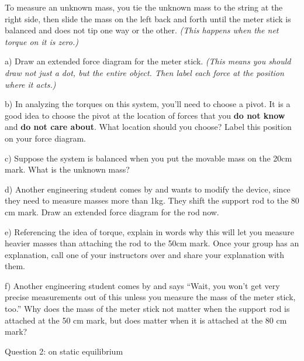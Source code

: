 \documentclass[12pt]{article}
\begin{document}
To measure an unknown mass, you tie the unknown mass to the string at the right side, then slide the mass on the left back and forth until the meter stick is balanced and does not tip one way or the other. \textit{(This happens when the net torque on it is zero.)}



a) Draw an extended force diagram for the meter stick. \textit{(This means you should draw not just a dot, but the entire object. Then label each force at the position where it acts.)}

\vspace{3in}

b) In analyzing the torques on this system, you'll need to choose a pivot. It is a good idea to choose the pivot at the location of forces that you {\bf do not know} and {\bf do not care about}. What location should you choose? Label this position on your force diagram.

\vspace{1in}

\newpage

c) Suppose the system is balanced when you put the movable mass on the 20cm mark. What is the unknown mass?

\vspace{2in}

d) Another engineering student comes by and wants to modify the device, since they need to measure masses more than 1kg. They shift the support rod to the 80 cm mark. Draw an extended force diagram for the rod now.

\vspace{2in}

e) Referencing the idea of torque, explain in words why this will let you measure heavier masses than attaching the rod to the 50cm mark. Once your group has an explanation, call one of your instructors over and share your explanation with them.

\vspace{1.5in}

f) Another engineering student comes by and says ``Wait, you won't get very precise measurements out of this unless you measure the mass of the meter stick, too.'' Why does the mass of the meter stick not matter when the support rod is attached at the 50 cm mark, but does matter when it is attached at the 80 cm mark?


\newpage


\centerline{\large Question 2: on static equilibrium}
\end{document}
